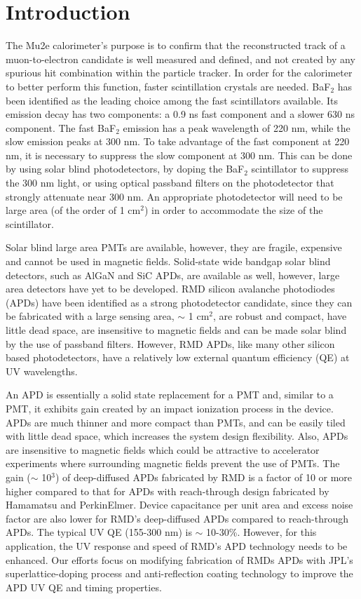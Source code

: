 \section[1]{Introduction}

The Mu2e calorimeter{'}s purpose is to confirm that the reconstructed track of a muon-to-electron candidate is well measured and defined, and not created by any spurious hit combination within the particle tracker. In order for the calorimeter to better perform this function, faster scintillation crystals are needed. BaF$_2$ has been identified as the leading choice among the fast scintillators available. Its emission decay has two components: a 0.9 ns fast component and a slower 630 ns component. The fast BaF$_2$ emission has a peak wavelength of 220 nm, while the slow emission peaks at 300 nm. To take advantage of the fast component at 220 nm, it is necessary to suppress the slow component at 300 nm. This can be done by using solar blind photodetectors, by doping the BaF$_2$ scintillator to suppress the 300 nm light, or using optical passband filters on the photodetector that strongly attenuate near 300 nm. An appropriate photodetector will need to be large area (of the order of 1 cm$^2$) in order to accommodate the size of the scintillator. 

Solar blind large area PMTs are available, however, they are fragile, expensive and cannot be used in magnetic fields. Solid-state wide bandgap solar blind detectors, such as AlGaN and SiC APDs, are available as well, however, large area detectors have yet to be developed. RMD silicon avalanche photodiodes (APDs) have been identified as a strong photodetector candidate, since they can be fabricated with a large sensing area, $\sim$ 1 cm$^2$, are robust and compact, have little dead space, are insensitive to magnetic fields and can be made solar blind by the use of passband filters. However, RMD APDs, like many other silicon based photodetectors, have a relatively low external quantum efficiency (QE) at UV wavelengths. 

An APD is essentially a solid state replacement for a PMT and, similar to a PMT, it exhibits gain created by an impact ionization process in the device. APDs are much thinner and more compact than PMTs, and can be easily tiled with little dead space, which increases the system design flexibility. Also, APDs are insensitive to magnetic fields which could be attractive to accelerator experiments where surrounding magnetic fields prevent the use of PMTs. The gain ($\sim$ 10$^3$) of deep-diffused APDs fabricated by RMD is a factor of 10 or more higher compared to that for APDs with reach-through design fabricated by Hamamatsu and PerkinElmer. Device capacitance per unit area and excess noise factor are also lower for RMD{'}s deep-diffused APDs compared to reach-through APDs. The typical UV QE (155-300 nm) is $\sim$ 10-30\%. However, for this application, the UV response and speed of RMD{'}s APD technology needs to be enhanced. Our efforts focus on modifying fabrication of RMDs APDs with JPL's superlattice-doping process and anti-reflection coating technology to improve the APD UV QE and timing properties.
